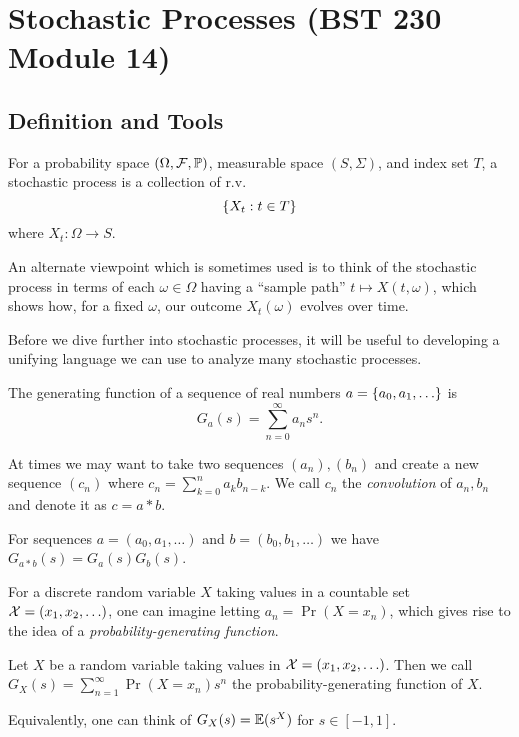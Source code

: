 \section{Stochastic Processes (BST 230 Module 14)}

\subsection{Definition and Tools}

\begin{definition}
    For a probability space $(\Omega, \mathcal F, \operatorname*{\mathbb{P}})$,
    measurable space $(S, \Sigma)$, and index set $T$, 
    a stochastic 
    process is a collection of r.v.\  
    \[
        \{X_t: t \in T\}
    \]
    where $X_t: \Omega \rightarrow S$.
\end{definition}

An alternate viewpoint which is sometimes used is to 
think of the stochastic process in terms of each $\omega \in \Omega$
having a ``sample path'' $t \mapsto X(t,\omega)$, which shows 
how, for a fixed $\omega$, our outcome $X_t(\omega)$ evolves over time.

Before we dive further into stochastic processes, it will be useful 
to developing a unifying language we can use to analyze many stochastic processes.

\begin{definition}
    The generating function of a sequence of real numbers $a = \{a_0, a_1, \hdots\}$ is 
    \[
        G_a(s) = \sum_{n=0}^{\infty} a_n s^n.
    \]
\end{definition}

At times we may want to take two sequences $(a_n),(b_n)$ and create 
a new sequence $(c_n)$ where $c_n = \sum_{k=0}^{n} a_k b_{n-k}$.
We call $c_n$ the \emph{convolution} of $a_n,b_n$ and denote it as 
$c = a * b$.

\begin{theorem}
    For sequences $a = (a_0, a_1, \hdots)$ and $b = (b_0, b_1, \hdots)$
    we have $G_{a * b}(s) = G_a(s) G_b(s)$.
\end{theorem}

For a discrete random variable $X$ taking values in a countable 
set $\mathcal X = (x_1, x_2, \hdots)$,
one can imagine letting $a_n = \Pr(X = x_n)$, which gives rise to the idea 
of a \emph{probability-generating function}.

\begin{definition}
    Let $X$ be a random variable taking values in $\mathcal X = (x_1, x_2, \hdots)$. 
    Then we call $G_{X}(s) = \sum_{n=1}^{\infty} \Pr(X=x_n) s^n$ the 
    probability-generating function of $X$.
    
    Equivalently, one can think of $G_X(s) = \operatorname*{\mathbb{E}}(s^X)$ for $s \in [-1,1]$.
\end{definition}

